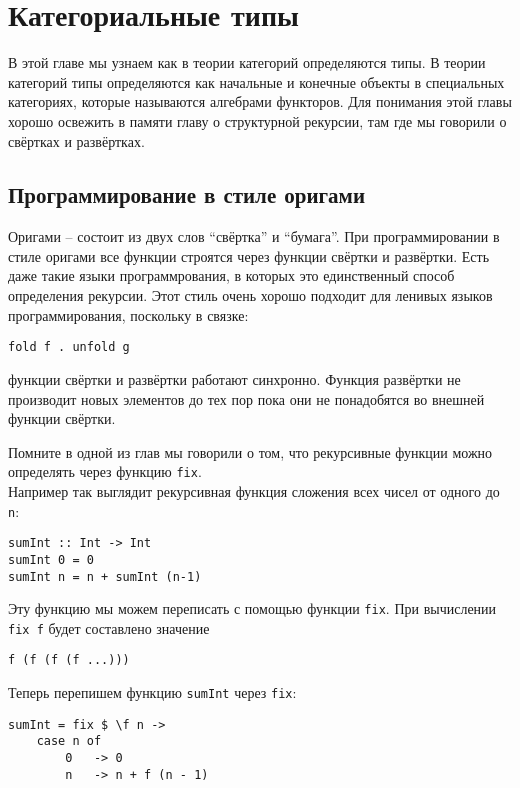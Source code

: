 \chapter{Категориальные типы}

В этой главе мы узнаем как в теории категорий определяются типы. В
теории категорий типы определяются как начальные и конечные объекты в
специальных категориях, которые называются алгебрами функторов. Для
понимания этой главы хорошо освежить в памяти главу о структурной
рекурсии, там где мы говорили о свёртках и развёртках.

\section{Программирование в стиле оригами}

Оригами -- состоит из двух слов ``свёртка'' и ``бумага''. При
программировании в стиле оригами все функции строятся через функции
свёртки и развёртки. Есть даже такие языки программрования, в которых
это единственный способ определения рекурсии. Этот стиль очень хорошо
подходит для ленивых языков программирования, поскольку в связке:

\begin{verbatim}
fold f . unfold g
\end{verbatim}

\noindent 

функции свёртки и развёртки работают синхронно. Функция развёртки не
производит новых элементов до тех пор пока они не понадобятся во внешней
функции свёртки.

Помните в одной из глав мы говорили о том, что рекурсивные функции можно
определять через функцию \texttt{fix}.\\Например так выглядит
рекурсивная функция сложения всех чисел от одного до \texttt{n}:

\begin{verbatim}
sumInt :: Int -> Int
sumInt 0 = 0
sumInt n = n + sumInt (n-1)
\end{verbatim}

Эту функцию мы можем переписать с помощью функции \texttt{fix}. При
вычислении \texttt{fix f} будет составлено значение

\begin{verbatim}
f (f (f (f ...)))
\end{verbatim}

Теперь перепишем функцию \texttt{sumInt} через \texttt{fix}:

\begin{verbatim}
sumInt = fix $ \f n ->
    case n of 
        0   -> 0
        n   -> n + f (n - 1)    
\end{verbatim}

